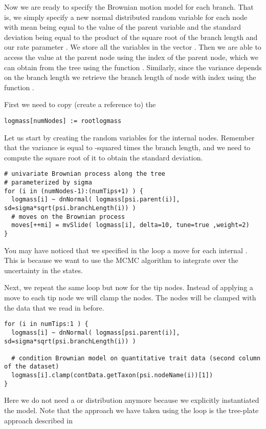 Now we are ready to specify the Brownian motion model for each branch.
That is, we simply specify a new normal distributed random variable for each node with mean being equal to the value of the parent variable and the standard deviation being equal to the product of the square root of the branch length and our rate parameter . We store all the variables in the vector . Then we are able to access the value at the parent node using the index of the parent node, which we can obtain from the tree using the function . Similarly, since the variance depends on the branch length we retrieve the branch length of node with index  using the function .

First we need to copy (create a reference to) the 
{\tt \small \begin{snugshade*}
\begin{lstlisting}
logmass[numNodes] := rootlogmass
\end{lstlisting}
\end{snugshade*}}
Let us start by creating the random variables for the internal nodes. Remember that the variance is equal to -squared times the branch length, and we need to compute the square root of it to obtain the standard deviation.
{\tt \small \begin{snugshade*}
\begin{lstlisting}
# univariate Brownian process along the tree
# parameterized by sigma
for (i in (numNodes-1):(numTips+1) ) {
  logmass[i] ~ dnNormal( logmass[psi.parent(i)], sd=sigma*sqrt(psi.branchLength(i)) )
  # moves on the Brownian process
  moves[++mi] = mvSlide( logmass[i], delta=10, tune=true ,weight=2) 
}
\end{lstlisting}
\end{snugshade*}}
You may have noticed that we specified in the loop a move for each internal . This is because we want to use the MCMC algorithm to integrate over the uncertainty in the states.

Next, we repeat the same loop but now for the tip nodes. Instead of applying a move to each tip node we will clamp the nodes. The nodes will be clamped with the data that we read in before.
{\tt \small \begin{snugshade*}
\begin{lstlisting}
for (i in numTips:1 ) {
  logmass[i] ~ dnNormal( logmass[psi.parent(i)], sd=sigma*sqrt(psi.branchLength(i)) )

  # condition Brownian model on quantitative trait data (second column of the dataset)
  logmass[i].clamp(contData.getTaxon(psi.nodeName(i))[1])
}
\end{lstlisting}
\end{snugshade*}}
Here we do not need a  or  distribution anymore because we explicitly instantiated the model. Note that the approach we have taken using the loop is the tree-plate approach described in \citep{Hohna2014b}

